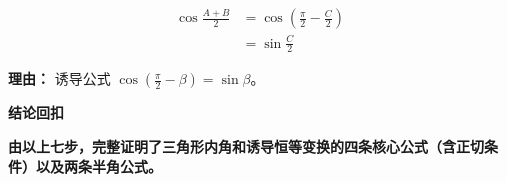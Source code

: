 \begin{proofbox}
\begin{description}[style=nextline, leftmargin=2.8em, labelsep=0.5em, itemsep=0.55em]
		\item[\textbf{步骤七（半角余弦）：}]
			\[
				\begin{aligned}
					\cos\frac{A+B}{2} &= \cos\left(\frac{\pi}{2} - \frac{C}{2}\right) \\
					&= \sin\frac{C}{2}
			\end{aligned}
			\]
			\par\textbf{理由：} 诱导公式 $\cos(\frac{\pi}{2} - \beta)=\sin\beta$。
	\end{description}

	\medskip
	\textbf{\textcolor{CProof}{结论回扣}}

	\textbf{由以上七步，完整证明了三角形内角和诱导恒等变换的四条核心公式（含正切条件）以及两条半角公式。}
\end{proofbox}
